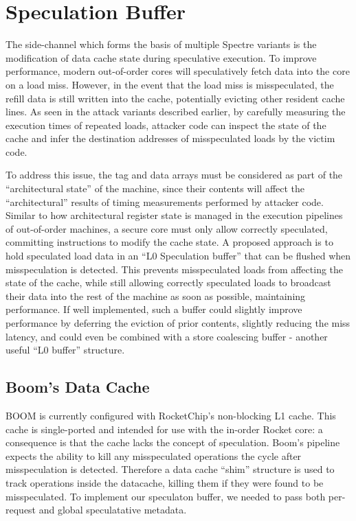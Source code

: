 \section{Speculation Buffer}
\label{specbuf}
The side-channel which forms the basis of multiple Spectre variants is the modification of data cache state during speculative execution.
To improve performance, modern out-of-order cores will speculatively fetch data into the core on a load miss.
However, in the event that the load miss is misspeculated, the refill data is still written into the cache, potentially evicting other resident cache lines.
As seen in the attack variants described earlier, by carefully measuring the execution times of repeated loads, attacker code can inspect the state of the cache and infer the destination addresses of misspeculated loads by the victim code.

To address this issue, the tag and data arrays must be considered as part of the ``architectural state'' of the machine, since their contents will affect the ``architectural'' results of timing measurements performed by attacker code.
Similar to how architectural register state is managed in the execution pipelines of out-of-order machines, a secure core must only allow correctly speculated, committing instructions to modify the cache state.
A proposed approach is to hold speculated load data in an ``L0 Speculation buffer'' that can be flushed when misspeculation is detected.
This prevents misspeculated loads from affecting the state of the cache, while still allowing correctly speculated loads to broadcast their data into the rest of the machine as soon as possible, maintaining performance. If well implemented, such a buffer could slightly improve performance by deferring the eviction of prior contents, slightly reducing the miss latency, and could even be combined with a store coalescing buffer - another useful ``L0 buffer'' structure.

\subsection{Boom's Data Cache}
BOOM is currently configured with RocketChip's non-blocking L1 cache. This cache is single-ported and intended for use with the in-order Rocket core: a consequence is that the cache lacks the concept of speculation. Boom's pipeline expects the ability to kill any misspeculated operations the cycle after misspeculation is detected. Therefore a data cache ``shim'' structure is used to track operations inside the datacache, killing them if they were found to be misspeculated. To implement our speculaton buffer, we needed to pass both per-request and global speculatative metadata.

